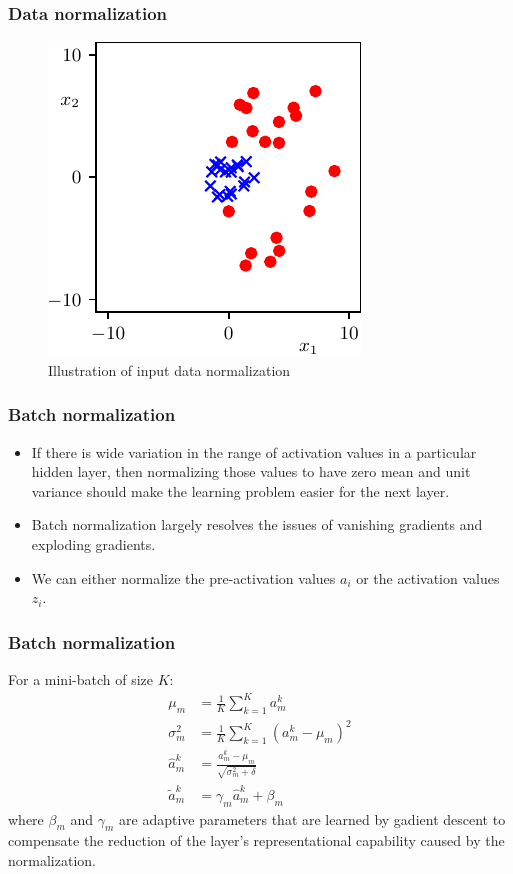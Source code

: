 \documentclass{beamer}
\begin{document}
\begin{frame}
    \frametitle{Data normalization}
    \begin{figure}
        \caption{Illustration of input data normalization}
        \includegraphics{Figure_7.pdf}
    \end{figure}
\end{frame}

\begin{frame}
    \frametitle{Batch normalization}
    \begin{itemize}
        \item If there is wide variation in the range of activation values in a particular hidden layer, then normalizing those values to have zero mean and unit variance should make the learning problem easier for the next layer.
        \item Batch normalization largely resolves the issues of vanishing gradients and exploding gradients.
        \item We can either normalize the pre-activation values $a_{i}$ or the activation values $z_{i}$.
    \end{itemize}
\end{frame}

\begin{frame}
    \frametitle{Batch normalization}
    For a mini-batch of size $K$:
    \begin{align*}
        \mu_{m}&=\frac{1}{K}\sum_{k=1}^{K}a^{k}_{m} \\
        \sigma^{2}_{m}&=\frac{1}{K}\sum_{k=1}^{K}(a^{k}_{m}-\mu_{m})^{2} \\
        \hat{a}^{k}_{m}&=\frac{a^{k}_{m}-\mu_{m}}{\sqrt{\sigma^{2}_{m}+\delta}} \\
        \tilde{a}^{k}_{m}&=\gamma_{m}\hat{a}^{k}_{m}+\beta_{m}
    \end{align*}
    where $\beta_{m}$ and $\gamma_{m}$ are adaptive parameters that are learned by gadient descent to compensate the reduction of the layer's representational capability caused by the normalization.
\end{frame}
\end{document}
